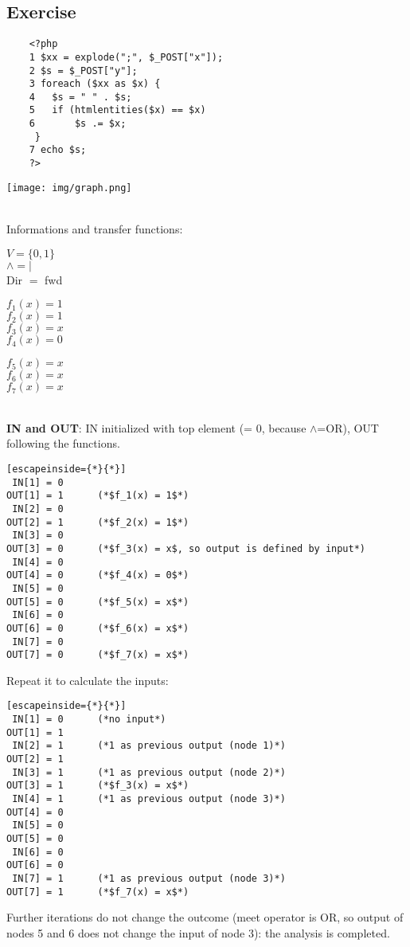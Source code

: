 \documentclass[a4paper, 10pt, titlepage]{article}
\begin{document}
\subsection{Exercise}
\begin{minipage}{0.6\textwidth}
\begin{lstlisting}
	<?php
	1 $xx = explode(";", $_POST["x"]);
	2 $s = $_POST["y"];
	3 foreach ($xx as $x) {
	4	$s = " " . $s;
	5	if (htmlentities($x) == $x)
	6		$s .= $x;
 	 }
	7 echo $s;
	?>
\end{lstlisting}
\end{minipage}
\begin{minipage}{0.35\textwidth}
\texttt{[image: img/graph.png]}
\end{minipage}\\
Informations and transfer functions:\medskip\\
\begin{minipage}{0.2\textwidth}
$ V = \{0,1\}$\\
$ \wedge = | $\\
Dir $=$ fwd 
\end{minipage}
\begin{minipage}{0.15\textwidth}
$f_1(x) = 1$\\
$f_2(x) = 1$\\
$f_3(x) = x$\\
$f_4(x) = 0$
\end{minipage}
\begin{minipage}{0.15\textwidth}
$f_5(x) = x$\\
$f_6(x) = x$\\
$f_7(x) = x$
\end{minipage} \bigskip\\
\textbf{IN and OUT}: IN initialized with top element (= 0, because $\wedge$=OR), OUT following the functions.
\begin{lstlisting}[escapeinside={*}{*}]
 IN[1] = 0
OUT[1] = 1		(*$f_1(x) = 1$*)
 IN[2] = 0
OUT[2] = 1		(*$f_2(x) = 1$*)
 IN[3] = 0
OUT[3] = 0		(*$f_3(x) = x$, so output is defined by input*)
 IN[4] = 0
OUT[4] = 0		(*$f_4(x) = 0$*)
 IN[5] = 0
OUT[5] = 0		(*$f_5(x) = x$*)
 IN[6] = 0
OUT[6] = 0		(*$f_6(x) = x$*)
 IN[7] = 0
OUT[7] = 0		(*$f_7(x) = x$*)
\end{lstlisting}
Repeat it to calculate the inputs:
\begin{lstlisting}[escapeinside={*}{*}]
 IN[1] = 0		(*no input*)
OUT[1] = 1
 IN[2] = 1		(*1 as previous output (node 1)*)
OUT[2] = 1
 IN[3] = 1		(*1 as previous output (node 2)*)
OUT[3] = 1		(*$f_3(x) = x$*)
 IN[4] = 1		(*1 as previous output (node 3)*)
OUT[4] = 0
 IN[5] = 0
OUT[5] = 0
 IN[6] = 0
OUT[6] = 0
 IN[7] = 1		(*1 as previous output (node 3)*)
OUT[7] = 1		(*$f_7(x) = x$*)
\end{lstlisting}
Further iterations do not change the outcome (meet operator is OR, so output of nodes 5 and 6 does not change the input of node 3): the analysis is completed.
\end{document}
